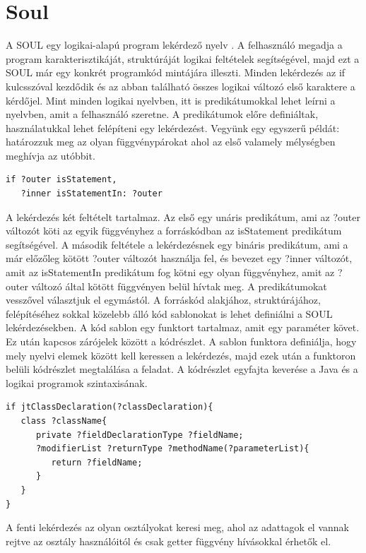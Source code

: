 \documentclass[a4paper,12pt]{report}
\begin{document}
\section{Soul}
\par A SOUL egy logikai-alapú program lekérdező nyelv \cite{soul}. A felhasználó megadja a program karakterisztikáját, struktúráját logikai feltételek segítségével, majd ezt a SOUL már egy konkrét programkód mintájára illeszti.
Minden lekérdezés az if kulcsszóval kezdődik és az abban található összes logikai változó első karaktere a kérdőjel. Mint minden logikai nyelvben, itt is predikátumokkal lehet leírni a nyelvben, amit a felhasználó szeretne. A predikátumok előre definiáltak, használatukkal lehet felépíteni egy lekérdezést. Vegyünk egy egyszerű példát: határozzuk meg az olyan függvénypárokat ahol az első valamely mélységben meghívja az utóbbit.
\begin{verbatim}
if ?outer isStatement, 
   ?inner isStatementIn: ?outer
\end{verbatim}
\par A lekérdezés két feltételt tartalmaz. Az első egy unáris predikátum, ami az ?outer változót köti az egyik függvényhez a forráskódban az isStatement predikátum segítségével. A második feltétele a lekérdezésnek egy bináris predikátum, ami a már előzőleg kötött ?outer változót használja fel, és bevezet egy ?inner változót, amit az isStatementIn predikátum fog kötni egy olyan függvényhez, amit az ?outer változó által kötött függvényen belül hívtak meg. A predikátumokat vesszővel választjuk el egymástól. A forráskód alakjához, struktúrájához, felépítéséhez sokkal közelebb álló kód sablonokat is lehet definiálni a SOUL lekérdezésekben. A kód sablon egy funktort tartalmaz, amit egy paraméter követ. Ez után kapcsos zárójelek között a kódrészlet. A sablon funktora definiálja, hogy mely nyelvi elemek között kell keressen a lekérdezés, majd ezek után a funktoron belüli kódrészlet megtalálása a feladat. A kódrészlet egyfajta keverése a Java és a logikai programok szintaxisának.
\begin{verbatim}
if jtClassDeclaration(?classDeclaration){
   class ?className{
      private ?fieldDeclarationType ?fieldName;
      ?modifierList ?returnType ?methodName(?parameterList){
         return ?fieldName;
      }
   }
}
\end{verbatim}
A fenti lekérdezés az olyan osztályokat keresi meg, ahol az adattagok el vannak rejtve az osztály használóitól és csak getter függvény hívásokkal érhetők el.
\end{document}
